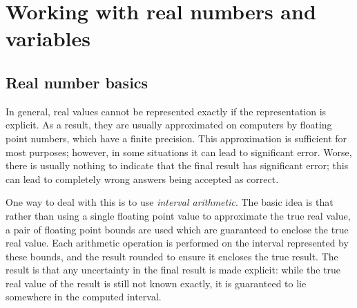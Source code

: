 %
% 
% 
% 
% 

\chapter{Working with real numbers and variables}
\label{chapreal}

\setcounter{topnumber}{1}


\section{Real number basics}

In general, real values cannot be represented exactly if the representation
is explicit.  As a result, they are usually approximated on computers by
floating point numbers, which have a finite precision.  This approximation
is sufficient for most purposes; however, in some situations it can lead to
significant error.  Worse, there is usually nothing to indicate that the
final result has significant error; this can lead to completely wrong
answers being accepted as correct.

One way to deal with this is to use \emph{interval arithmetic}.
The basic idea is that rather than using a single floating point value to
approximate the true real value, a pair of floating point bounds are used
which are guaranteed to enclose the true real value.  Each arithmetic
operation is performed on the interval represented by these bounds, and the
result rounded to ensure it encloses the true result.  The result is that
any uncertainty in the final result is made explicit: while the true real
value of the result is still not known exactly, it is guaranteed to lie
somewhere in the computed interval.

